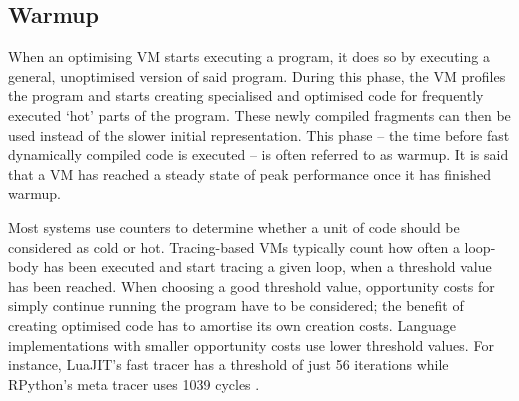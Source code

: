 











\subsection{Warmup}

When an optimising VM starts executing a program, it does so by executing a
general, unoptimised version of said program. During this phase, the VM profiles
the program and starts creating specialised and optimised code for frequently
executed `hot' parts of the program. These newly compiled fragments can then be
used instead of the slower initial representation. This phase -- the time before
fast dynamically compiled code is executed -- is often referred to as warmup.
It is said that a VM has reached a steady state of peak performance once it has
finished warmup.

Most systems use counters to determine whether a unit of code should be
considered as cold or hot. Tracing-based VMs typically count how often a loop-body has
been executed and start tracing a given loop, when a threshold value has been
reached. When choosing a good threshold value, opportunity costs for simply
continue running the program have to be considered; the benefit
of creating optimised code has to amortise its own creation costs. Language
implementations with smaller opportunity costs use lower threshold values. For
instance, LuaJIT's fast tracer has a threshold of just 56 iterations while
RPython's meta tracer uses
1039 cycles .

